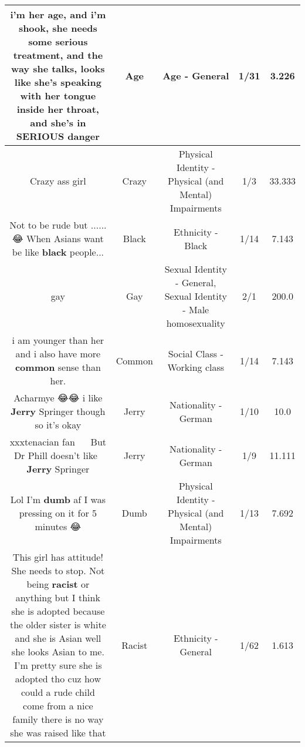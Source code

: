 \documentclass[11pt]{article}
\newlength\mylength
\begin{document}
\begin{center}
\begin{longtable}{|C{.65\mylength}|C{.30\mylength}|C{.12\mylength}|C{.12\mylength}|C{.12\mylength}|}
  \small i'm her \textbf{age}, and i'm shook, she needs some serious treatment, and the way she talks, looks like she's speaking with her tongue inside her throat, and she's in SERIOUS danger\normalsize   & Age & Age - General & 1/31 & 3.226 \\  \hline
  \small Crazy ass girl\normalsize   & Crazy & Physical Identity - Physical (and Mental) Impairments & 1/3 & 33.333 \\  \hline
  \small Not to be  rude but ...... 😂  When Asians want be like \textbf{black} people...\normalsize   & Black & Ethnicity - Black & 1/14 & 7.143 \\  \hline
  \small gay\normalsize   & Gay & Sexual Identity - General, Sexual Identity - Male homosexuality & 2/1 & 200.0 \\  \hline
  \small i am younger than her  and i also have more \textbf{common} sense than her.\normalsize   & Common & Social Class - Working class & 1/14 & 7.143 \\  \hline
  \small Acharmye 😂😂 i like \textbf{Jerry} Springer though so it's okay\normalsize   & Jerry & Nationality - German & 1/10 & 10.0 \\  \hline
  \small xxxtenacian fan  🤣🤣🤣But Dr Phill doesn't like  \textbf{Jerry} Springer\normalsize   & Jerry & Nationality - German & 1/9 & 11.111 \\  \hline
  \small Lol I'm \textbf{dumb} af I was pressing on it for 5 minutes 😂\normalsize   & Dumb & Physical Identity - Physical (and Mental) Impairments & 1/13 & 7.692 \\  \hline
  \small This girl has attitude! She needs to stop. Not being \textbf{racist} or anything but I think she is adopted because the older sister is white and she is Asian well she looks Asian to me. I'm pretty sure she is adopted tho cuz how could a rude child come from a nice family there is no way she was raised like that\normalsize   & Racist & Ethnicity - General & 1/62 & 1.613 \\  \hline

\end{longtable}
\end{center}
\end{document}
